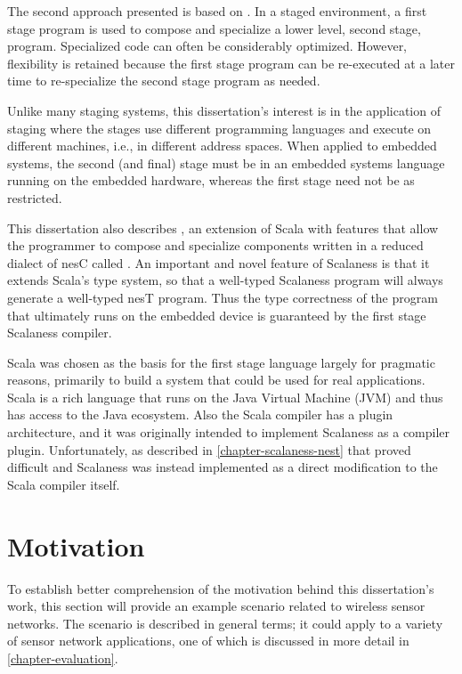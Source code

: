 The second approach presented is based on 
\cite{Taha-MetaML,Sheard-TemplateHaskell,Mainland-Flask-2008,FramedML}. In a staged environment,
a first stage program is used to compose and specialize a lower level, second stage, program.
Specialized code can often be considerably optimized. However, flexibility is retained because
the first stage program can be re-executed at a later time to re-specialize the second stage
program as needed.

Unlike many staging systems, this dissertation's interest is in the application of staging where
the stages use different programming languages and execute on different machines, i.e., in
different address spaces. When applied to embedded systems, the second (and final) stage must be
in an embedded systems language running on the embedded hardware, whereas the first stage need
not be as restricted.

This dissertation also describes  \cite{chapin-GPCE-2013}, an extension
of Scala \cite{PiS2} with features that allow the programmer to compose and specialize
components written in a reduced dialect of nesC called . An important and novel
feature of Scalaness is that it extends Scala's type system, so that a well-typed Scalaness
program will always generate a well-typed nesT program. Thus the type correctness of the program
that ultimately runs on the embedded device is guaranteed by the first stage Scalaness compiler.

Scala was chosen as the basis for the first stage language largely for pragmatic reasons,
primarily to build a system that could be used for real applications. Scala is a rich language
that runs on the Java Virtual Machine (JVM) and thus has access to the Java ecosystem. Also the
Scala compiler has a plugin architecture, and it was originally intended to implement Scalaness
as a compiler plugin. Unfortunately, as described in \autoref{chapter-scalaness-nest} that
proved difficult and Scalaness was instead implemented as a direct modification to the Scala
compiler itself.

\section{Motivation}

To establish better comprehension of the motivation behind this dissertation's work, this section
will provide an example scenario related to wireless sensor networks. The scenario is described
in general terms; it could apply to a variety of sensor network applications, one of which is
discussed in more detail in \autoref{chapter-evaluation}.

